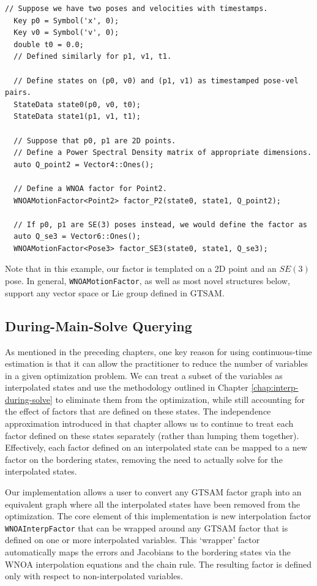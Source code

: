 \begin{lstlisting}[style=C++Style, label={lst:wnoa}, caption={Example setup for WNOA factors.}]
  // Suppose we have two poses and velocities with timestamps.
  Key p0 = Symbol('x', 0);
  Key v0 = Symbol('v', 0);
  double t0 = 0.0;
  // Defined similarly for p1, v1, t1.
  
  // Define states on (p0, v0) and (p1, v1) as timestamped pose-vel pairs.
  StateData state0(p0, v0, t0);
  StateData state1(p1, v1, t1);
  
  // Suppose that p0, p1 are 2D points.
  // Define a Power Spectral Density matrix of appropriate dimensions.
  auto Q_point2 = Vector4::Ones();
  
  // Define a WNOA factor for Point2.
  WNOAMotionFactor<Point2> factor_P2(state0, state1, Q_point2);
  
  // If p0, p1 are SE(3) poses instead, we would define the factor as
  auto Q_se3 = Vector6::Ones();
  WNOAMotionFactor<Pose3> factor_SE3(state0, state1, Q_se3);
\end{lstlisting}

Note that in this example, our factor is templated on a 2D point and an $SE(3)$ pose. In general, \texttt{WNOAMotionFactor}, as well as most novel structures below, support any vector space or Lie group defined in \ac{GTSAM}. 

\subsection{During-Main-Solve Querying}\label{sec:during-query-implem}

As mentioned in the preceding chapters, one key reason for using continuous-time estimation is that it can allow the practitioner to reduce the number of variables in a given optimization problem.
We can treat a subset of the variables as interpolated states and use the methodology outlined in Chapter \ref{chap:interp-during-solve} to eliminate them from the optimization, while still accounting for the effect of factors that are defined on these states.
The independence approximation introduced in that chapter allows us to continue to treat each factor defined on these states separately (rather than lumping them together).
Effectively, each factor defined on an interpolated state can be mapped to a new factor on the bordering states, removing the need to actually solve for the interpolated states.

Our implementation allows a user to convert any \ac{GTSAM} factor graph into an equivalent graph where all the interpolated states have been removed from the optimization.
The core element of this implementation is new interpolation factor \texttt{WNOAInterpFactor} that can be wrapped around any \ac{GTSAM} factor that is defined on one or more interpolated variables.
This `wrapper' factor automatically maps the errors and Jacobians to the bordering states via the \ac{WNOA} interpolation equations and the chain rule.
The resulting factor is defined only with respect to non-interpolated variables.

